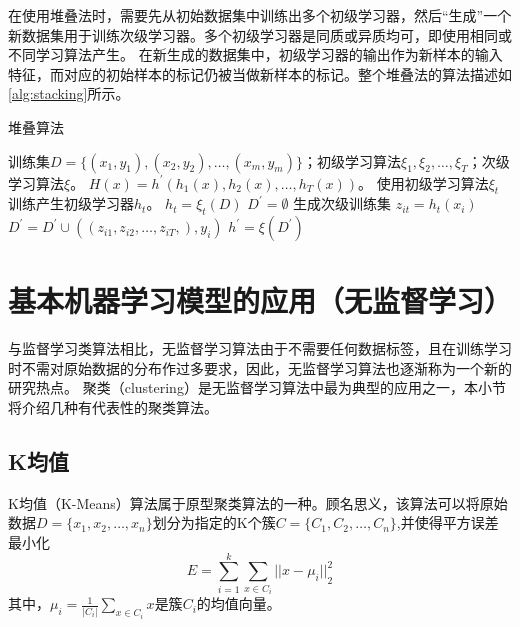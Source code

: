 在使用堆叠法时，需要先从初始数据集中训练出多个初级学习器，然后“生成”一个新数据集用于训练次级学习器。多个初级学习器是同质或异质均可，即使用相同或不同学习算法产生。
在新生成的数据集中，初级学习器的输出作为新样本的输入特征，而对应的初始样本的标记仍被当做新样本的标记。整个堆叠法的算法描述如\autoref{alg:stacking}所示。
\begin{breakablealgorithm}
    \caption[堆叠算法]{堆叠算法\cite{Zhou2016}}
    \label{alg:stacking}
    \begin{algorithmic}[1] %
        \Require 训练集$D=\{(x_1,y_1),(x_2,y_2),\dots,(x_m,y_m)\}$；初级学习算法$\xi_1,\xi_2,\dots,\xi_T$；次级学习算法$\xi$。
        \Ensure $H(x)=h^{'}(h_1(x),h_2(x),\dots,h_T(x))$。
            \State 使用初级学习算法$\xi_t$训练产生初级学习器$h_t$。
            \State $h_t=\xi_t (D)$
        \EndFor
        \State $D^{'}=\emptyset$
        \State 生成次级训练集
                \State $z_{it}=h_t(x_i)$
            \EndFor
            \State $D^{'}=D^{'} \cup ((z_{i1},z_{i2},\dots,z_{iT},),y_i)$
        \EndFor
        \State $h^{'}=\xi(D^{'})$
    \end{algorithmic}
\end{breakablealgorithm}

\section{基本机器学习模型的应用（无监督学习）}
与监督学习类算法相比，无监督学习算法由于不需要任何数据标签，且在训练学习时不需对原始数据的分布作过多要求，因此，无监督学习算法也逐渐称为一个新的研究热点。
聚类（clustering）是无监督学习算法中最为典型的应用之一，本小节将介绍几种有代表性的聚类算法。

\subsection{K均值}
K均值（K-Means）算法属于原型聚类算法的一种\cite{Zhou2016,Liu2018}。顾名思义，该算法可以将原始数据$D=\{x_1,x_2,\dots,x_n\}$划分为指定的K个簇$C=\{C_1,C_2,\dots,C_n\}$,并使得平方误差最小化
\begin{equation}
    \label{equ:leastsq}
    E=\sum_{i=1}^k \sum_{x \in C_i}{||x- \mu_i||}_2^2
\end{equation}
其中，$\mu_i = \frac{1}{|C_i|} \sum_{x \in C_i}{x}$是簇$C_i$的均值向量。


